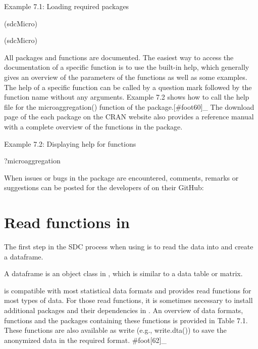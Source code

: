 \documentclass[letterpaper,10pt,english]{sphinxmanual}
\begin{document}
Example 7.1: Loading required packages

(sdcMicro) 

(sdcMicro) 

All packages and functions are documented. The easiest way to access the
documentation of a specific function is to use the built-in help, which
generally gives an overview of the parameters of the functions as well
as some examples. The help of a specific function can be called by a
question mark followed by the function name without any arguments.
Example 7.2 shows how to call the help file for the microaggregation()
function of the  package.{[}\#foot60{]}\_ The download
page of the each package on the CRAN website also provides a reference
manual with a complete overview of the functions in the package.

Example 7.2: Displaying help for functions

?microaggregation 

When issues or bugs in the  package are encountered, comments,
remarks or suggestions can be posted for the developers of  on
their GitHub: 


\section{Read functions in }
\label{\detokenize{sdcMicro:read-functions-in-r}}
The first step in the SDC process when using  is to read the
data into  and create a dataframe. %
\begin{footnote}[2]\sphinxAtStartFootnote
A dataframe is an object class in , which is similar to a data
table or matrix.
%
\end{footnote}  is
compatible with most statistical data formats and provides read
functions for most types of data. For those read functions, it is
sometimes necessary to install additional packages and their
dependencies in . An overview of data formats, functions and the
packages containing these functions is provided in Table 7.1. These
functions are also available as write (e.g., write.dta()) to save the
anonymized data in the required format. \#foot{[}62{]}\_
\end{document}

